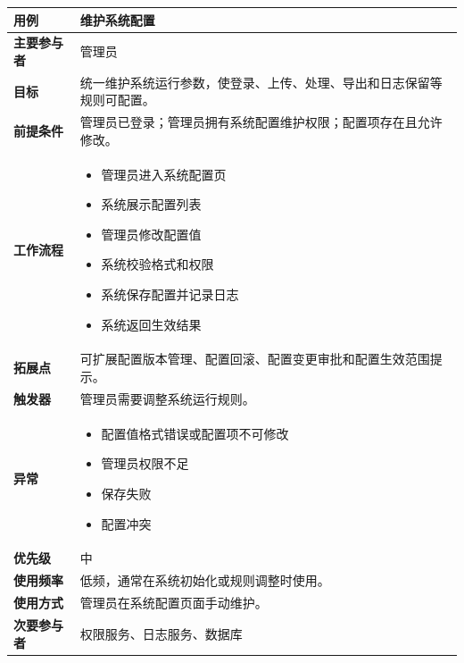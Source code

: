 \begin{table}[H]
    \centering
    \begin{tabular}{|p{3cm}|p{11.5cm}|}
        \hline
        \textbf{用例} & 维护系统配置 \\
        \hline
        \textbf{主要参与者} & 管理员 \\
        \hline
        \textbf{目标} & 统一维护系统运行参数，使登录、上传、处理、导出和日志保留等规则可配置。 \\
        \hline
        \textbf{前提条件} & 管理员已登录；管理员拥有系统配置维护权限；配置项存在且允许修改。 \\
        \hline
        \textbf{工作流程} &
        \vspace{-0.3cm}
        \begin{itemize}
            \item 管理员进入系统配置页
            \item 系统展示配置列表
            \item 管理员修改配置值
            \item 系统校验格式和权限
            \item 系统保存配置并记录日志
            \item 系统返回生效结果
        \end{itemize} \vspace{-0.3cm} \\
        \hline
        \textbf{拓展点} & 可扩展配置版本管理、配置回滚、配置变更审批和配置生效范围提示。 \\
        \hline
        \textbf{触发器} & 管理员需要调整系统运行规则。 \\
        \hline
        \textbf{异常} &
        \vspace{-0.3cm}
        \begin{itemize}
            \item 配置值格式错误或配置项不可修改
            \item 管理员权限不足
            \item 保存失败
            \item 配置冲突
        \end{itemize} \vspace{-0.3cm} \\
        \hline
        \textbf{优先级} & 中 \\
        \hline
        \textbf{使用频率} & 低频，通常在系统初始化或规则调整时使用。 \\
        \hline
        \textbf{使用方式} & 管理员在系统配置页面手动维护。 \\
        \hline
        \textbf{次要参与者} & 权限服务、日志服务、数据库 \\
        \hline
    \end{tabular}
\end{table}

